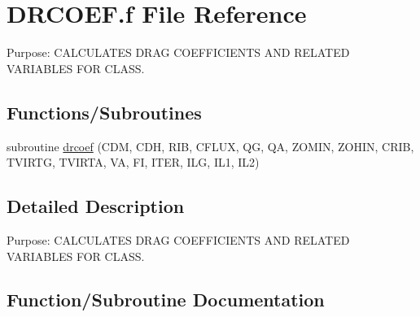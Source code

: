 \hypertarget{DRCOEF_8f}{}\section{D\+R\+C\+O\+E\+F.\+f File Reference}
\label{DRCOEF_8f}


Purpose\+: C\+A\+L\+C\+U\+L\+A\+T\+E\+S D\+R\+A\+G C\+O\+E\+F\+F\+I\+C\+I\+E\+N\+T\+S A\+N\+D R\+E\+L\+A\+T\+E\+D V\+A\+R\+I\+A\+B\+L\+E\+S F\+O\+R C\+L\+A\+S\+S.  


\subsection*{Functions/\+Subroutines}
\begin{DoxyCompactItemize}
\item 
subroutine \hyperlink{DRCOEF_8f_aae5a711d9800a0a042c1cd85f78c87dc}{drcoef} (C\+D\+M, C\+D\+H, R\+I\+B, C\+F\+L\+U\+X, Q\+G, Q\+A, Z\+O\+M\+I\+N, Z\+O\+H\+I\+N, C\+R\+I\+B, T\+V\+I\+R\+T\+G, T\+V\+I\+R\+T\+A, V\+A, F\+I, I\+T\+E\+R, I\+L\+G, I\+L1, I\+L2)
\end{DoxyCompactItemize}


\subsection{Detailed Description}
Purpose\+: C\+A\+L\+C\+U\+L\+A\+T\+E\+S D\+R\+A\+G C\+O\+E\+F\+F\+I\+C\+I\+E\+N\+T\+S A\+N\+D R\+E\+L\+A\+T\+E\+D V\+A\+R\+I\+A\+B\+L\+E\+S F\+O\+R C\+L\+A\+S\+S. 



\subsection{Function/\+Subroutine Documentation}
\hypertarget{DRCOEF_8f_aae5a711d9800a0a042c1cd85f78c87dc}{}

